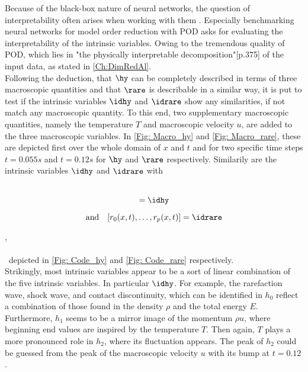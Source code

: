 Because of the black-box nature of neural networks, the question of interpretability often arises when working with them \cite{fan2021interpretability}. Especially benchmarking neural networks for model order reduction with POD asks for evaluating the interpretability of the intrinsic variables. Owing to the tremendous quality of POD, which lies in "the physically interpretable decomposition"\cite{Kutz}[p.375] of the input data, as stated in \cref{Ch:DimRedAl}.\\
Following the deduction, that \(\hy\) can be completely described in terms of three macroscopic quantities and that \(\rare\) is describable in a similar way, it is put to test if the intrinsic variables \(\idhy\) and \(\idrare\) show any similarities, if not match any macroscopic quantity. To this end, two supplementary macroscopic quantities, namely the temperature \(T\) and macroscopic velocity \(u\), are added to the three macroscopic variables. In \cref{Fig: Macro_hy} and \cref{Fig: Macro_rare}, these are depicted first over the whole domain of \(x\) and \(t\) and for two specific time steps \(t=0.055s\) and \(t=0.12s\) for \(\hy\) and \(\rare\) respectively. Similarily are the intrinsic variables \(\idhy\) and \(\idrare\) with\\\\
\begin{minipage}{0.45\textwidth}
	\begin{equation}
		[h_0(x,t),\dots,h_p(x,t)] = \idhy
	\end{equation}
\end{minipage}%
\begin{minipage}{0.45\textwidth}
	\begin{equation}
		\mathrm{and}\quad[r_0(x,t),\dots,r_p(x,t)] = \idrare
	\end{equation}
\end{minipage},\\\\\
depicted in \cref{Fig: Code_hy} and \cref{Fig: Code_rare} respectively.\\
Strikingly, most intrinsic variables appear to be a sort of linear combination of the five intrinsic variables. In particular \(\idhy\). For example, the rarefaction wave, shock wave, and contact discontinuity, which can be identified in \(h_0\) reflect a combination of those found in the density \(\rho\) and the total energy \(E\). Furthermore, \(h_1\) seems to be a mirror image of the momentum \(\rho u\), where beginning end values are inspired by the temperature \(T\). Then again, \(T\) plays a more pronounced role in \(h_2\), where its fluctuation appears. The peak of \(h_2\) could be guessed from the peak of the macroscopic velocity \(u\) with its bump at \(t=0.12\).\\

